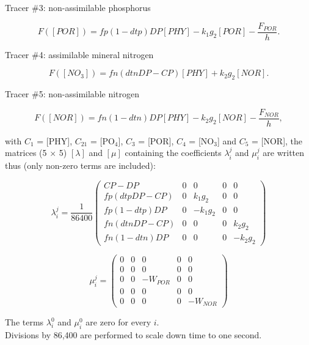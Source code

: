 Tracer $\#$3: non-assimilable phosphorus

\begin{equation}
  F([POR]) = fp(1-dtp) DP [PHY] - k_1 g_2 [POR] - \frac{F_{POR}}{h}.
\end{equation}

Tracer $\#$4: assimilable mineral nitrogen

\begin{equation}
  F([NO_3]) = fn (dtn DP - CP) [PHY] + k_2 g_2 [NOR].
\end{equation}

Tracer $\#$5: non-assimilable nitrogen

\begin{equation}
  F([NOR]) = fn (1- dtn) DP [PHY] - k_2 g_2 [NOR] - \frac{F_{NOR}}{h},
\end{equation}

with $C_1$ = [PHY], $C_21$ = [PO$_4$], $C_3$ = [POR], $C_4$ = [NO$_3$] and $C_5$ = [NOR],
the matrices (5 $\times$ 5) $[\lambda]$ and $[\mu]$ containing the coefficients
$\lambda_i^j$ and $\mu_i^j$ are written thus (only non-zero terms are included):

\begin{equation}
\lambda_i^j = \frac{1}{86400}
\left(
  \begin{array}{ccccc}
    CP-DP & 0 & 0 & 0 & 0 \\ %
    fp (dtp DP -CP) & 0 &  k_1 g_2 & 0 & 0 \\ %
    fp (1-dtp) DP   & 0 & -k_1 g_2 & 0 & 0 \\ %
    fn (dtn DP -CP) & 0 &        0 & 0 &  k_2 g_2 \\ %
    fn (1-dtn) DP   & 0 &        0 & 0 & -k_2 g_2
  \end{array}
\right)
\end{equation}

$$
  \mu_i^j = 
  \begin{pmatrix}
   0 & 0 & 0 & 0 &  0 \\
   0 & 0 & 0 & 0 &  0 \\
   0 & 0 & -W_{POR} & 0 & 0 \\
   0 & 0 & 0 & 0 &  0 \\
   0 & 0 & 0 & 0 & -W_{NOR}
  \end{pmatrix}
$$  

The terms $\lambda_i^0$ and $\mu_i^0$ are zero for every $i$.\\

Divisions by 86,400 are performed to scale down time to one second.
